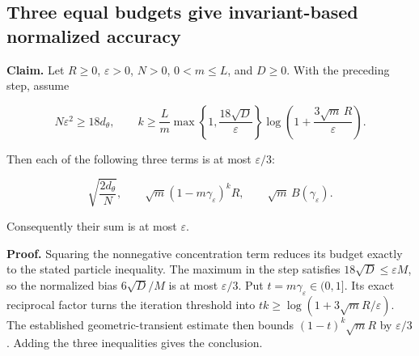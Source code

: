 \documentclass[11pt,a4paper]{report}
\begin{document}
\subsection{\texorpdfstring{Three equal budgets give invariant-based normalized accuracy}{Three equal budgets give invariant-based normalized accuracy}}
\label{report-step-WassersteinMixing-IPLARates-lean-3}


\textbf{Claim.} Let \(R\ge0\), \(\varepsilon>0\), \(N>0\), \(0<m\le L\), and \(D\ge0\). With the preceding step, assume

\[N\varepsilon^2\ge18d_\theta,\qquad k\ge\frac Lm\max\!\left\{1,\frac{18\sqrt D}{\varepsilon}\right\}\log\!\left(1+\frac{3\sqrt m\,R}{\varepsilon}\right).\]


Then each of the following three terms is at most \(\varepsilon/3\):

\[\sqrt{\frac{2d_\theta}{N}},\qquad \sqrt m(1-m\gamma_\varepsilon)^kR,\qquad \sqrt m\,B(\gamma_\varepsilon).\]


Consequently their sum is at most \(\varepsilon\).




\textbf{Proof.} Squaring the nonnegative concentration term reduces its budget exactly to the stated particle inequality. The maximum in the step satisfies \(18\sqrt D\le\varepsilon M\), so the normalized bias \(6\sqrt D/M\) is at most \(\varepsilon/3\). Put \(t=m\gamma_\varepsilon\in(0,1]\). Its exact reciprocal factor turns the iteration threshold into \(tk\ge\log(1+3\sqrt mR/\varepsilon)\). The established geometric-transient estimate then bounds \((1-t)^k\sqrt mR\) by \(\varepsilon/3\). Adding the three inequalities gives the conclusion.
\end{document}
